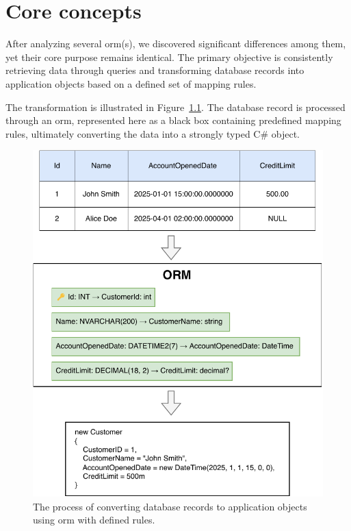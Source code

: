 \chapter{Core concepts}\label{chapter:core_concepts}

After analyzing several \acrshort{orm}(s), we discovered significant differences among them, yet their core purpose remains identical. The primary objective is consistently retrieving data through queries and transforming database records into application objects based on a defined set of mapping rules.

The transformation is illustrated in Figure~\ref{fig:db_to_orm}. The database record is processed through an \acrshort{orm}, represented here as a black box containing predefined mapping rules, ultimately converting the data into a strongly typed C\# object.


\begin{figure}[h]
  \centering
  \includegraphics[scale=1.0]{thesis/img/thesis/02_orm_transformation.drawio.pdf}
  \caption{The process of converting database records to application objects using \acrshort{orm} with defined rules.}
  \label{fig:db_to_orm}
\end{figure}

